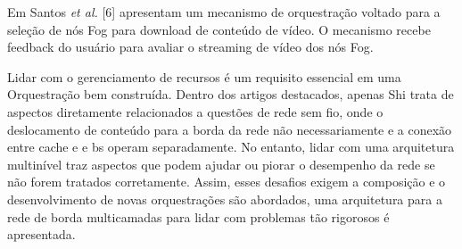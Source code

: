 Em Santos \textit{et al.} [6] apresentam um mecanismo de orquestração voltado para a seleção de nós Fog para download de conteúdo de vídeo. O mecanismo recebe feedback do usuário para avaliar o streaming de vídeo dos nós Fog.

Lidar com o gerenciamento de recursos é um requisito essencial em uma Orquestração bem construída. Dentro dos artigos destacados, apenas Shi trata de aspectos diretamente relacionados a questões de rede sem fio, onde o deslocamento de conteúdo para a borda da rede não necessariamente e a conexão entre cache e e bs operam separadamente. No entanto, lidar com uma arquitetura multinível traz aspectos que podem ajudar ou piorar o desempenho da rede se não forem tratados corretamente. Assim, esses desafios exigem a composição e o desenvolvimento de novas orquestrações são abordados, uma arquitetura para a rede de borda multicamadas para lidar com problemas tão rigorosos é apresentada.